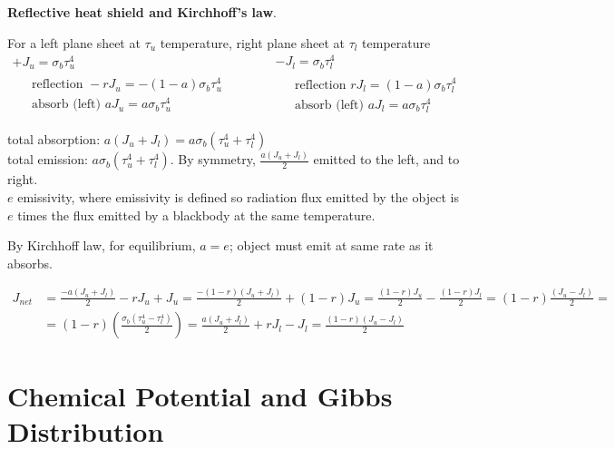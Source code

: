 \documentclass[twoside]{amsart}
\theoremstyle{plain}
\theoremstyle{definition}
\newcommand{\exercisehead}[1]
  {
   \noindent{\small\bf Exercise #1.}
   \smallskip}
\begin{document}
\exercisehead{19} \textbf{Reflective heat shield and Kirchhoff's law}.  

For a left plane sheet at $\tau_u$ temperature, right plane sheet at $\tau_l$ temperature
\[
\begin{gathered}
  +J_u = \sigma_b \tau_u^4 \\
  \begin{aligned}
    & \text{ reflection }  -r J_u = - (1-a) \sigma_b \tau_u^4 \\ 
    & \text{ absorb (left) } aJ_u = a \sigma_b \tau_u^4 
\end{aligned}
\end{gathered}
 \quad \quad \quad \begin{gathered}
   -J_l = \sigma_b \tau_l^4  \\ 
  \begin{aligned}
    & \text{ reflection } r J_l = (1- a) \sigma_b \tau_l^4 \\ 
    & \text{ absorb (left) } aJ_l = a \sigma_b \tau_l^4 
\end{aligned}
\end{gathered}
\]

total absorption: $a(J_u + J_l) = a\sigma_b(\tau_u^4 + \tau_l^4 ) $ \\
total emission: $a\sigma_b (\tau_u^4 + \tau_l^4 )$.  By symmetry, $\frac{a(J_u + J_l ) }{2}$ emitted to the left, and to right.\\
$e$ emissivity, where emissivity is defined so radiation flux emitted by the object is $e$ times the flux emitted by a blackbody at the same temperature.  

By Kirchhoff law, for equilibrium, $a=e$; object must emit at same rate as it absorbs.  

\[
\begin{aligned}
  J_{net} & = \frac{-a(J_u + J_l )}{2} - r J_u + J_u = \frac{ - (1-r)(J_u  + J_l ) }{2} + (1-r) J_u = \frac{(1-r) J_u }{2} - \frac{(1-r) J_l }{2} = (1-r) \frac{(J_u - J_l)}{2} = \\
  & = (1-r) \left( \frac{ \sigma_b (\tau_u^4 - \tau_l^4  )}{2} \right)  = \frac{a(J_u + J_l )}{2} + r J_l - J_l    = \boxed{ \frac{(1-r) (J_u - J_l) }{2}  }
\end{aligned} 
\]







\section{Chemical Potential and Gibbs Distribution}
\end{document}
